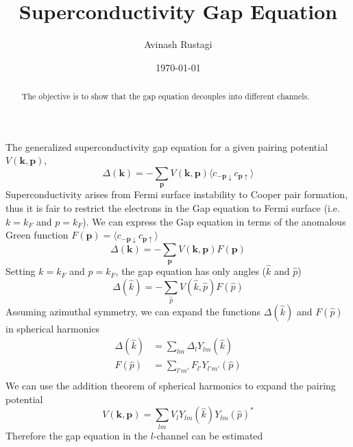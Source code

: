 \documentclass[aps,prb,onecolumn,notitlepage,showpacs,floatfix,superscriptaddress]{revtex4-1}
\begin{document}
\title{Superconductivity Gap Equation}

\author{Avinash Rustagi}
%
\date{\today}
\begin{abstract}
The objective is to show that the gap equation decouples into different channels.
\end{abstract}

\maketitle
%
The generalized superconductivity gap equation for a given pairing potential $V({\bm k},{\bm p})$,
\begin{equation}
\Delta({\bm k}) = -\sum_{{\bm p}} V({\bm k},{\bm p}) \langle c_{-{\bm p} \downarrow} c_{{\bm p} \uparrow} \rangle
\end{equation}
Superconductivity arises from Fermi surface instability to Cooper pair formation, thus it is fair to restrict the electrons in the Gap equation to Fermi surface (i.e. $k=k_F$ and $p=k_F$). We can express the Gap equation in terms of the anomalous Green function $F({\bm p}) =  \langle c_{-{\bm p} \downarrow} c_{{\bm p} \uparrow} \rangle$
\begin{equation}
\Delta({\bm k}) = -\sum_{{\bm p}} V({\bm k},{\bm p}) F({\bm p})
\end{equation}
Setting $k=k_F$ and $p=k_F$, the gap equation has only angles ($\hat{k}$ and $\hat{p}$)
\begin{equation}
\Delta(\hat{k}) = -\sum_{\hat{p}} V(\hat{k},\hat{p}) F({\hat{ p}}) 
\end{equation}
Assuming azimuthal symmetry, we can expand the functions $\Delta(\hat{k})$ and $F({\hat{ p}})$ in spherical harmonics
\begin{equation}
\begin{split}
\Delta(\hat{k}) &= \sum_{lm} \Delta_{l} Y_{lm}(\hat{k}) \\
F(\hat{p}) &= \sum_{l'm'} F_{l'} Y_{l'm'}(\hat{p}) \\
\end{split}
\end{equation}
We can use the addition theorem of spherical harmonics to expand the pairing potential
\begin{equation}
V({\bm k},{\bm p}) = \sum_{lm} V_{l} Y_{lm}(\hat{k}) Y_{lm}(\hat{p})^*
\end{equation}
Therefore the gap equation in the $l$-channel can be estimated
\end{document}
